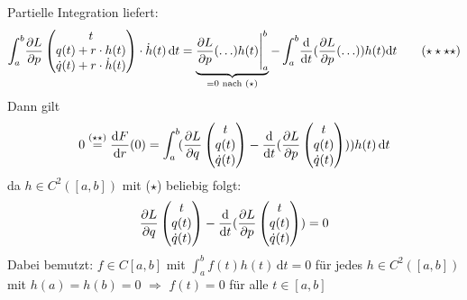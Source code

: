 Partielle Integration liefert:
\begin{align*}
	\int_{a} ^{b} \! \frac{{\partial L}}{{\partial p}}  \begin{pmatrix}
		t \\ q(t) + r \cdot h(t) \\ \dot q(t) + r \cdot \dot h(t)
	\end{pmatrix} \cdot  \dot h (t)  \, \mathrm{d}t = \underbrace{\frac{{\partial L}}{{\partial p}}  (\ldots ) h(t)\Bigg|_a^b}_{=0 \text{ nach }(\star)} - \int_{a} ^{b} \! \frac{\mathrm{d}}{\mathrm{d}t} 
	(\frac{{\partial L}}{{\partial p}}  (\ldots ) )  h(t)   \mathrm{d}t \tag{$\star\star\star\star$}
\end{align*}
Dann gilt
\[
	0 \stackrel{(\star\star)}{=} \frac{\mathrm{d} F}{\mathrm{d}r} (0) = \int_{a} ^{b} \! (\frac{{\partial L}}{{\partial q}}  \begin{pmatrix}
		t \\ q(t) \\ \dot q(t)
	\end{pmatrix}  - \frac{\mathrm{d}}{\mathrm{d}t} ( \frac{{\partial L}}{{\partial p}}  \begin{pmatrix}
		t \\ q(t) \\ \dot q(t)
	\end{pmatrix} ) )  h(t) \, \mathrm{d}t
\]
da $h\in C^2([a,b])$ mit ($\star$) beliebig folgt: 
\[
	\frac{{\partial L}}{{\partial q}}  \begin{pmatrix}
		t \\ q(t) \\ \dot q(t)
	\end{pmatrix} - \frac{\mathrm{d}}{\mathrm{d} t} ( \frac{{\partial L}}{{\partial p}}  \begin{pmatrix}
		t \\ q(t) \\ \dot q(t)
	\end{pmatrix}) =0 
\]  
Dabei bemutzt: $f \in C[a,b]$ mit $\int_{a} ^{b} \! f(t) h(t)  \, \mathrm{d}t =0$ für jedes $h \in C^2([a,b])$ mit $h(a)=h(b)=0$ $\Rightarrow $ $f(t)=0$ für alle 
$t \in[a,b]$ \bewende

